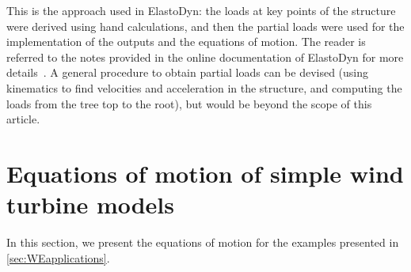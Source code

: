 \documentclass[wes, manuscript]{copernicus}
\renewcommand{\v}[1]{\boldsymbol{#1}}
\newcommand{\todoBoth}    [1]{{\colorbox{yellow}{TODO Both:    }}{\color{red}{#1}}\colorbox{yellow}{/}}
\begin{document}
% 
This is the approach used in ElastoDyn: the loads at key points of the structure were derived using hand calculations, and then the partial loads were used for the implementation of the outputs and the equations of motion. The reader is referred to the notes provided in the online documentation of ElastoDyn for more details~\citep{OpenFAST}. A general procedure to obtain partial loads can be devised (using kinematics to find velocities and acceleration in the structure, and computing the loads from the tree top to the root), but would be beyond the scope of this article. 







\section{Equations of motion of simple wind turbine models}

In this section, we present the equations of motion for the examples presented in \autoref{sec:WEapplications}. 
   
\end{document}
